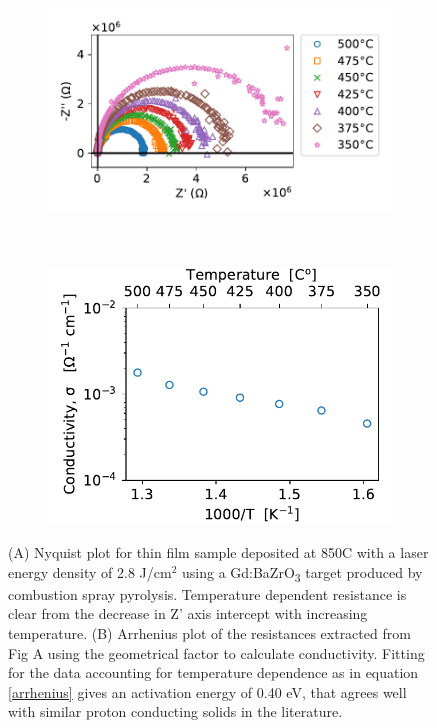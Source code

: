 \begin{figure}
\centering
\begin{subfigure}{.9\linewidth}
    \centering
    \includegraphics{Figures/180522-film-PraxBZG-850-air-nyquist.pdf}
    \caption{}
    \label{films:fig:ny:praxBZG850}
\end{subfigure}
\\
\vspace{.4in}
\centering
\begin{subfigure}{.9\linewidth}
    \centering
    \includegraphics{Figures/180522-film-PraxBZG-850-air.pdf}
    \caption{}
    \label{films:fig:arr:praxBZGair}
\end{subfigure}
\caption{(A) Nyquist plot for thin film sample deposited at 850\textdegree C with a laser energy density of 2.8 J/cm$^2$ using a Gd:BaZrO\textsubscript{3} target produced by combustion spray pyrolysis. Temperature dependent resistance is clear from the decrease in Z' axis intercept with increasing temperature. (B) Arrhenius plot of the resistances extracted from Fig A using the geometrical factor to calculate conductivity. Fitting for the data accounting for temperature dependence as in equation \ref{arrhenius} gives an activation energy of 0.40 eV, that agrees well with similar proton conducting solids in the literature.}
\end{figure}


